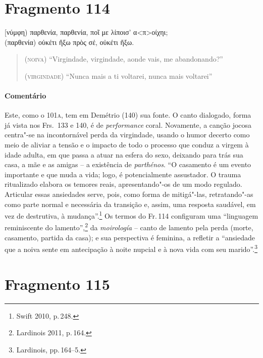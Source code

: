 {\pagebreak
\section{Fragmento 114}

\begin{gkverse}
[νύμφη) παρθενία, παρθενία, ποῖ με λίποισ’ α<π>οίχηι;\\
(παρθενία)  \dagger{}οὐκέτι ἤξω πρὸς σέ, οὐκέτι ἤξω\dagger{}.
\end{gkverse}

\begin{verse}
(\textsc{noiva}) ``Virgindade, virgindade, aonde vais, me abandonando?''

(\textsc{virgindade}) ``Nunca mais a ti voltarei, nunca mais voltarei''
\end{verse}

\medskip

{\paragraph{Comentário} Este, como o 101\textsc{a}, tem em Demétrio (140) sua fonte. O canto dialogado, forma já vista
nos Frs.~133 e 140, é de \textit{performance} coral. Novamente, a canção jocosa
centra"-se na incontornável perda da virgindade, usando o humor decerto como
meio de aliviar a tensão e o impacto de todo o processo que conduz a virgem à
idade adulta, em que passa a atuar na esfera do sexo, deixando para trás sua casa, a mãe e as amigas -- a existência de \textit{parthénos}.
``O casamento é um evento importante e que muda a vida; logo, é potencialmente assustador. O trauma ritualizado elabora os temores reais, apresentando"-os de um modo regulado. Articular essas ansiedades serve, pois, como forma de mitigá"-las, retratando"-as como parte normal e necessária da transição e, assim, uma resposta saudável, em vez de destrutiva, à mudança''.\footnote{Swift 2010, p.\,248.}
Os termos do Fr.\,114 configuram uma ``linguagem reminiscente do lamento'',\footnote{Lardinois 2011, p.\,164.} da \textit{moirología} -- canto de lamento pela perda (morte, casamento, partida da casa); e sua perspectiva é feminina, a refletir a ``ansiedade que a noiva sente em antecipação à noite nupcial e à nova vida com seu marido''.\footnote{Lardinois, pp.\,164--5.}}



\pagebreak
\section{Fragmento 115}

}
